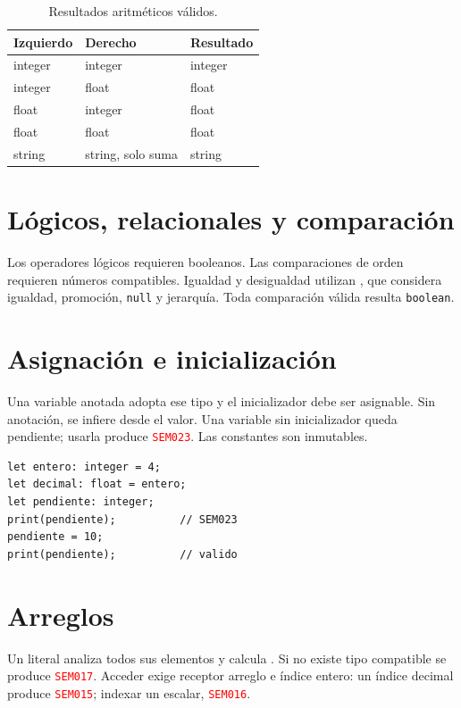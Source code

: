 \documentclass[11pt,letterpaper,oneside]{report}
\newcommand{\archivo}[1]{\path{#1}}
\newcommand{\codigo}[1]{\texttt{#1}}
\newcommand{\diag}[1]{\textcolor{red}{\texttt{#1}}}
\begin{document}
\begin{table}[H]
\centering
\begin{tabular}{lll}
\toprule
Izquierdo & Derecho & Resultado \\
\midrule
integer & integer & integer \\
integer & float & float \\
float & integer & float \\
float & float & float \\
string & string, solo suma & string \\
\bottomrule
\end{tabular}
\caption{Resultados aritméticos válidos.}
\end{table}

\section{Lógicos, relacionales y comparación}

Los operadores lógicos requieren booleanos. Las comparaciones de orden requieren
números compatibles. Igualdad y desigualdad utilizan \archivo{isComparable}, que
considera igualdad, promoción, \codigo{null} y jerarquía. Toda comparación válida
resulta \codigo{boolean}.

\section{Asignación e inicialización}

Una variable anotada adopta ese tipo y el inicializador debe ser asignable. Sin
anotación, se infiere desde el valor. Una variable sin inicializador queda pendiente;
usarla produce \diag{SEM023}. Las constantes son inmutables.

\begin{verbatim}
let entero: integer = 4;
let decimal: float = entero;
let pendiente: integer;
print(pendiente);          // SEM023
pendiente = 10;
print(pendiente);          // valido
\end{verbatim}

\section{Arreglos}

Un literal analiza todos sus elementos y calcula \archivo{commonType}. Si no existe
tipo compatible se produce \diag{SEM017}. Acceder exige receptor arreglo e índice
entero: un índice decimal produce \diag{SEM015}; indexar un escalar,
\diag{SEM016}.
\end{document}
